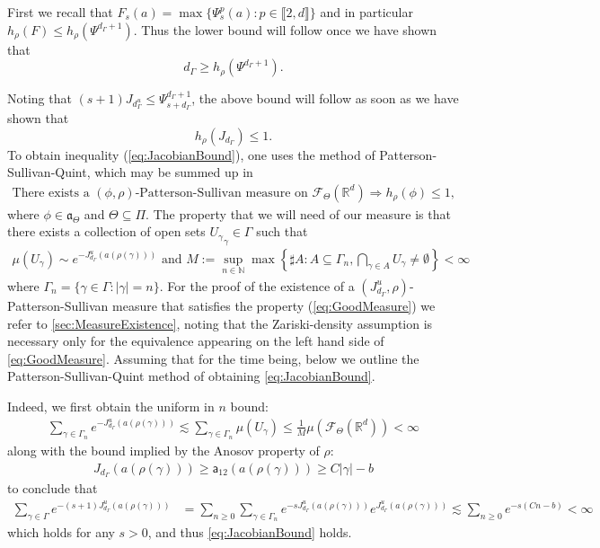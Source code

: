 \documentclass{report}
\begin{document}
First we recall that $F_s(a) = \max \{ \Psi_s^p(a) : p \in \llbracket 2, d \rrbracket\}$ and in particular $h_\rho(F) \leq h_\rho(\Psi^{d_\Gamma + 1})$.
Thus the lower bound will follow once we have shown that
$$d_\Gamma \geq h_\rho(\Psi^{d_\Gamma + 1}).$$

Noting that $(s+1) J_{d_\Gamma^u} \leq \Psi_{s+d_\Gamma}^{d_\Gamma + 1}$, the above bound will follow as soon as we have shown that
\begin{equation}\label{eq:JacobianBound}
    h_\rho(J_{d_\Gamma}) \leq 1.\tag{LB}
\end{equation}
To obtain inequality (\ref{eq:JacobianBound}), one uses the method of Patterson-Sullivan-Quint, which may be summed up in
\begin{align*}
    \text{There exists a } (\phi, \rho)\text{-Patterson-Sullivan measure on } \mathcal F_\Theta(\mathbb R^d) 
    \Rightarrow h_\rho(\phi) \leq 1,
\end{align*}
where $\phi \in \mathfrak a_\Theta$ and $ \Theta \subseteq \Pi$.
The property that we will need of our measure is that there exists a collection of open sets ${U_\gamma}_\gamma \in \Gamma$ such that
\begin{align*}\label{eq:GoodMeasure}
    \mu(U_\gamma) \sim e^{-J_{d_\Gamma}^u(a(\rho(\gamma)))} \text{ and } 
    M := \sup_{n \in \mathbb N}
    \max
    \left\{\sharp A : A \subseteq \Gamma_n,  \bigcap_{\gamma \in A}U_\gamma \neq \emptyset \right\} < \infty\tag{MP}
\end{align*}
where $\Gamma_n = \{ \gamma \in \Gamma : |\gamma| = n \} $.
For the proof of the existence of a $(J_{d_\Gamma}^u, \rho)$-Patterson-Sullivan measure that satisfies the property (\ref{eq:GoodMeasure}) we refer to \cref{sec:MeasureExistence}, noting that the Zariski-density assumption is necessary only for the equivalence appearing on the left hand side of \cref{eq:GoodMeasure}.
Assuming that for the time being, below we outline the Patterson-Sullivan-Quint method of obtaining \cref{eq:JacobianBound}.

Indeed, we first obtain the uniform in $n$ bound:
\begin{align*}
    \sum_{\gamma \in \Gamma_n}
    e^{-J_{d_\Gamma}^u(a(\rho(\gamma)))} \lesssim
    \sum_{\gamma \in \Gamma_n}
    \mu(U_\gamma) \leq \frac{1}{M} \mu(\mathcal F_\Theta(\mathbb R^d)) < \infty
\end{align*}
along with the bound implied by the Anosov property of $\rho$:
\begin{align*}
J_{d_\Gamma}(a(\rho(\gamma))) \geq \mathsf a_{12} (a(\rho(\gamma))) \geq C|\gamma| - b
\end{align*}
to conclude that
\begin{align*}
\sum_{\gamma \in \Gamma} e^{-(s+1)J^u_{d_\Gamma}(a(\rho(\gamma)))} &=
\sum_{n\geq 0} \sum_{\gamma \in \Gamma_n} e^{-s J^u_{d_\Gamma}(a(\rho(\gamma)))}
    e^{J^u_{d_\Gamma}(a(\rho(\gamma)))} \lesssim
\sum_{n\geq 0} e^{-s(Cn - b)} < \infty
\end{align*}
which holds for any $s>0$, and thus \cref{eq:JacobianBound} holds.
\end{document}
